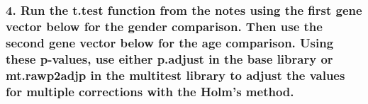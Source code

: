 \documentclass[]{article}
\begin{document}
\subsubsection{4. Run the t.test function from the notes using the first
gene vector below for the gender comparison. Then use the second gene
vector below for the age comparison. Using these p-values, use either
p.adjust in the base library or mt.rawp2adjp in the multitest library to
adjust the values for multiple corrections with the Holm's
method.}\label{run-the-t.test-function-from-the-notes-using-the-first-gene-vector-below-for-the-gender-comparison.-then-use-the-second-gene-vector-below-for-the-age-comparison.-using-these-p-values-use-either-p.adjust-in-the-base-library-or-mt.rawp2adjp-in-the-multitest-library-to-adjust-the-values-for-multiple-corrections-with-the-holms-method.}
\end{document}
